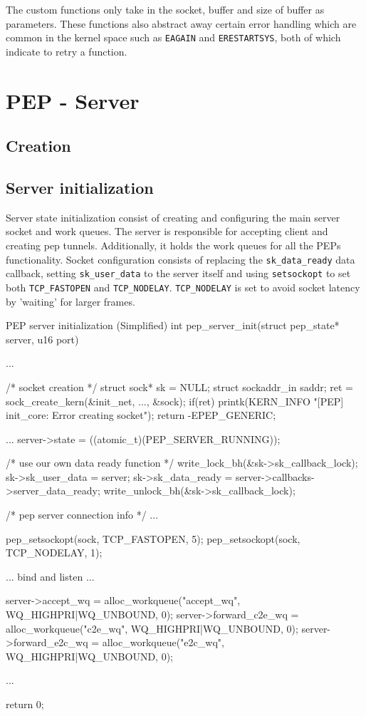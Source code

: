 \documentclass[a4paper,english, 11pt]{report}
\begin{document}
The custom functions only take in the socket, buffer and size of buffer as parameters. These functions also abstract away certain error handling which are common in the kernel space such as \verb|EAGAIN| and \verb|ERESTARTSYS|, both of which indicate to retry a function.

\section{PEP - Server}

\subsection{Creation}

\subsection{Server initialization}
Server state initialization consist of creating and configuring the main server socket and work queues. The server is responsible for accepting client and creating pep tunnels. Additionally, it holds the work queues for all the PEPs functionality. Socket configuration consists of replacing the \verb|sk_data_ready| data callback, setting \verb|sk_user_data| to the server itself and using \verb|setsockopt| to set both \verb|TCP_FASTOPEN| and \verb|TCP_NODELAY|. \verb|TCP_NODELAY| is set to avoid socket latency by 'waiting' for larger frames.

\begin{autonumlstlisting}[label=lst:pep_server_init]{PEP server initialization (Simplified)}
int pep_server_init(struct pep_state* server, u16 port)
{
	...

	/* socket creation */
	struct sock* sk = NULL;
	struct sockaddr_in saddr;
	ret = sock_create_kern(&init_net, ..., &sock);
	if(ret){
			printk(KERN_INFO "[PEP] init_core: Error creating socket\n");
			return -EPEP_GENERIC;
	}

	...
	server->state = ((atomic_t){(PEP_SERVER_RUNNING)});
	
	/* use our own data ready function */
	write_lock_bh(&sk->sk_callback_lock);
	sk->sk_user_data = server;
	sk->sk_data_ready = server->callbacks->server_data_ready;
	write_unlock_bh(&sk->sk_callback_lock);

	/* pep server connection info */
	...

	pep_setsockopt(sock, TCP_FASTOPEN, 5);
	pep_setsockopt(sock, TCP_NODELAY, 1);
	
	... bind and listen ...

	server->accept_wq = alloc_workqueue("accept_wq", WQ_HIGHPRI|WQ_UNBOUND, 0);
	server->forward_c2e_wq = alloc_workqueue("c2e_wq", WQ_HIGHPRI|WQ_UNBOUND, 0);
	server->forward_e2c_wq = alloc_workqueue("e2c_wq", WQ_HIGHPRI|WQ_UNBOUND, 0);

	...

	return 0;
}
\end{autonumlstlisting}
\end{document}
